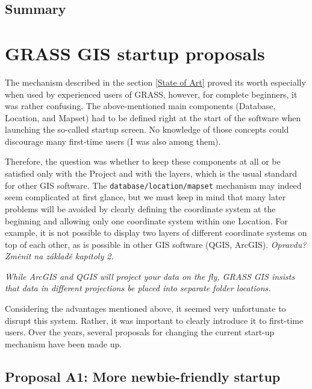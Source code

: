 \documentclass[a4paper,10pt,twoside]{article}
\begin{document}
\subsection{Summary}

\newpage
\vspace*{-1cm}
\section{GRASS GIS startup proposals}
\noindent
\large

\noindent The mechanism described in the section \ref{State of Art} proved its worth especially when used by experienced users of GRASS, however, for complete beginners, it was rather confusing. The above-mentioned main components (Database, Location, and Mapset) had to be defined right at the start of the software when launching the so-called startup screen. No knowledge of those concepts could discourage many first-time users (I was also among them).

Therefore, the question was whether to keep these components at all or be satisfied only with the Project and with the layers, which is the usual standard for other GIS software. The \texttt{database/location/mapset} mechanism may indeed seem complicated at first glance, but we must keep in mind that many later problems will be avoided by clearly defining the coordinate system at the beginning and allowing only one coordinate system within one Location. For example, it is not possible to display two layers of different coordinate systems on top of each other, as is possible in other GIS software (QGIS, ArcGIS). \textit{\color{red} Opravdu? Změnit na základě kapitoly 2.}

\textit{\color{red}While ArcGIS and QGIS will project your data on the fly, GRASS GIS insists that data in different projections be placed into separate folder locations.}

Considering the advantages mentioned above, it seemed very unfortunate to disrupt this system. Rather, it was important to clearly introduce it to first-time users. Over the years, several proposals for changing the current start-up mechanism have been made up.

\subsection{Proposal A1: More newbie-friendly startup}
\end{document}
